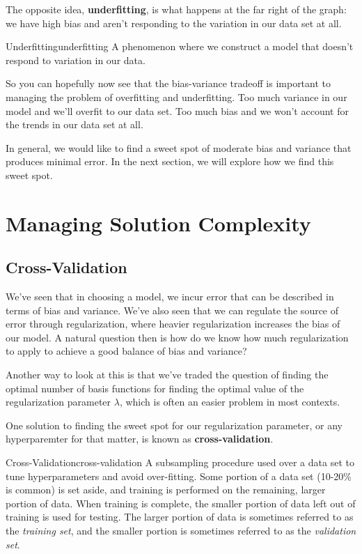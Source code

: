 The opposite idea, \textbf{underfitting}, is what happens at the far right of the graph: we have high bias and aren't responding to the variation in our data set at all.

\begin{definition}{Underfitting}{underfitting}
    A phenomenon where we construct a model that doesn't respond to variation in our data.
\end{definition}

So you can hopefully now see that the bias-variance tradeoff is important to managing the problem of overfitting and underfitting. Too much variance in our model and we'll overfit to our data set. Too much bias and we won't account for the trends in our data set at all.

In general, we would like to find a sweet spot of moderate bias and variance that produces minimal error. In the next section, we will explore how we find this sweet spot.

\section{Managing Solution Complexity}

\subsection{Cross-Validation}
We've seen that in choosing a model, we incur error that can be described in terms of bias and variance. We've also seen that we can regulate the source of error through regularization, where heavier regularization increases the bias of our model. A natural question then is how do we know how much regularization to apply to achieve a good balance of bias and variance?

Another way to look at this is that we've traded the question of finding the optimal number of basis functions for finding the optimal value of the regularization parameter $\lambda$, which is often an easier problem in most contexts.

One solution to finding the sweet spot for our regularization parameter, or any hyperparemter for that matter, is known as \textbf{cross-validation}.

\begin{definition}{Cross-Validation}{cross-validation}
    A subsampling procedure used over a data set to tune hyperparameters and avoid over-fitting. Some portion of a data set (10-20\% is common) is set aside, and training is performed on the remaining, larger portion of data. When training is complete, the smaller portion of data left out of training is used for testing. The larger portion of data is sometimes referred to as the \textit{training set}, and the smaller portion is sometimes referred to as the \textit{validation set}.
\end{definition}

